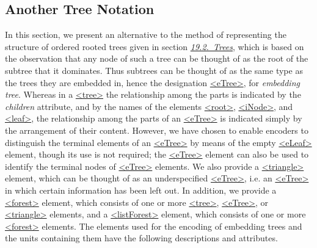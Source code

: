 \subsection[{Another Tree Notation}]{Another Tree Notation}\label{GDAT}\par
In this section, we present an alternative to the method of representing the structure of ordered rooted trees given in section \textit{\hyperref[GDTR]{19.2.\ Trees}}, which is based on the observation that any node of such a tree can be thought of as the root of the subtree that it dominates. Thus subtrees can be thought of as the same type as the trees they are embedded in, hence the designation \hyperref[TEI.eTree]{<eTree>}, for \textit{embedding tree}. Whereas in a \hyperref[TEI.tree]{<tree>} the relationship among the parts is indicated by the {\itshape children} attribute, and by the names of the elements \hyperref[TEI.root]{<root>}, \hyperref[TEI.iNode]{<iNode>}, and \hyperref[TEI.leaf]{<leaf>}, the relationship among the parts of an \hyperref[TEI.eTree]{<eTree>} is indicated simply by the arrangement of their content. However, we have chosen to enable encoders to distinguish the terminal elements of an \hyperref[TEI.eTree]{<eTree>} by means of the empty \hyperref[TEI.eLeaf]{<eLeaf>} element, though its use is not required; the \hyperref[TEI.eTree]{<eTree>} element can also be used to identify the terminal nodes of \hyperref[TEI.eTree]{<eTree>} elements. We also provide a \hyperref[TEI.triangle]{<triangle>} element, which can be thought of as an underspecified \hyperref[TEI.eTree]{<eTree>}, i.e. an \hyperref[TEI.eTree]{<eTree>} in which certain information has been left out. In addition, we provide a \hyperref[TEI.forest]{<forest>} element, which consists of one or more \hyperref[TEI.tree]{<tree>}, \hyperref[TEI.eTree]{<eTree>}, or \hyperref[TEI.triangle]{<triangle>} elements, and a \hyperref[TEI.listForest]{<listForest>} element, which consists of one or more \hyperref[TEI.forest]{<forest>} elements. The elements used for the encoding of embedding trees and the units containing them have the following descriptions and attributes. 
